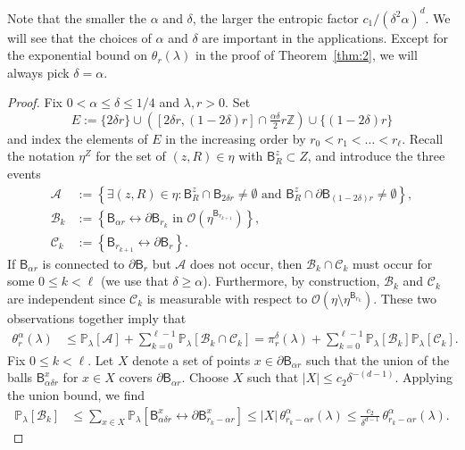 \documentclass[10pt]{amsart}
\theoremstyle{definition}\newtheorem{defi}[theo]{Definition}\newtheorem{rema}[theo]{Remark}\newtheorem{exam}[theo]{Example}\newtheorem{exem}[theo]{Example}\newtheorem{nota}[theo]{Notation}
\begin{document}
Note that the smaller the $\alpha$ and $\delta$, the larger the entropic factor $c_1/(\delta^2\alpha)^d$. We will see that the choices of $\alpha$ and $\delta$ are important in the applications. Except for the exponential bound on $\theta_r(\lambda)$ in the proof of Theorem~\ref{thm:2}, we will always pick $\delta=\alpha$.
\begin{proof}
Fix $0<\alpha\le \delta\le 1/4$ and $\lambda,r>0$. Set
\[
E:=\{2\delta r\}\cup \left([2\delta r,(1-2\delta)r]\cap \tfrac{\alpha\delta}{2} r{\mathbb Z}\right)\cup\{(1-2\delta)r\}
\]
and index the elements of $E$ in the increasing order by $r_0< r_1<\dots< r_\ell$. Recall the notation $\eta^Z$ for the set of $(z,R)\in \eta$ with $\mathsf B_R^z\subset Z$, and introduce the three events
\begin{align*}
{\mathcal A}&:=\left\{\exists (z,R)\in\eta:\mathsf B_R^z\cap\mathsf B_{2\delta r}\ne\emptyset\text{ and }\mathsf B_R^z\cap\partial\mathsf B_{(1-2\delta) r}\ne\emptyset\right\},\\
{\mathcal B}_k&:=\left\{\mathsf B_{\alpha r}\longleftrightarrow\partial\mathsf B_{r_k}\text{ in }{\mathcal O}\left(\eta^{\mathsf B_{r_{k+1}}}\right)\right\},\\
{\mathcal C}_k&:=\left\{\mathsf B_{r_{k+1}}\longleftrightarrow\partial\mathsf B_{r}\right\}.
\end{align*}
If $\mathsf B_{\alpha r}$ is connected to $\partial\mathsf B_r$ but ${\mathcal A}$ does not occur, then ${\mathcal B}_k\cap{\mathcal C}_k$ must occur for some $0\le k<\ell$ (we use that $\delta\ge\alpha$). Furthermore, by construction, ${\mathcal B}_k$ and ${\mathcal C}_k$ are independent since ${\mathcal C}_k$ is measurable with respect to ${\mathcal O}(\eta\setminus\eta^{\mathsf B_{r_{k}}})$. These two observations together imply that
\begin{align}\label{eq:j1}
\theta^\alpha_r (\lambda)&\le {\mathbb P}_\lambda[{\mathcal A}]+\sum_{k=0}^{\ell-1}{\mathbb P}_\lambda[{\mathcal B}_k\cap{\mathcal C}_k]=\pi^\delta_r(\lambda)+\sum_{k=0}^{\ell-1}{\mathbb P}_\lambda[{\mathcal B}_k]{\mathbb P}_\lambda[{\mathcal C}_k].
\end{align}
Fix $0\le k < \ell$. Let $X$ denote a set of points $x\in\partial\mathsf B_{\alpha r}$ such that the union of the balls $\mathsf B_{\alpha \delta r}^x$ for $x\in X$ covers $\partial\mathsf B_{\alpha r}$. Choose $X$ such that $|X|\le c_2 \delta^{-(d-1)}$. Applying the union bound, we find
\begin{align}
{\mathbb P}_\lambda[{\mathcal B}_k]&\le \sum_{x\in X}{\mathbb P}_\lambda\left[\mathsf B_{\alpha \delta r}^x\longleftrightarrow \partial\mathsf B_{r_k-\alpha r}^x\right]\le|X|\,\theta_{r_k-\alpha r}^\alpha(\lambda)\le \frac {c_2}{\delta^{d-1}}\,\theta_{r_k-\alpha r}^\alpha(\lambda).\label{eq:12}

\end{align}
\end{proof}
\end{document}
